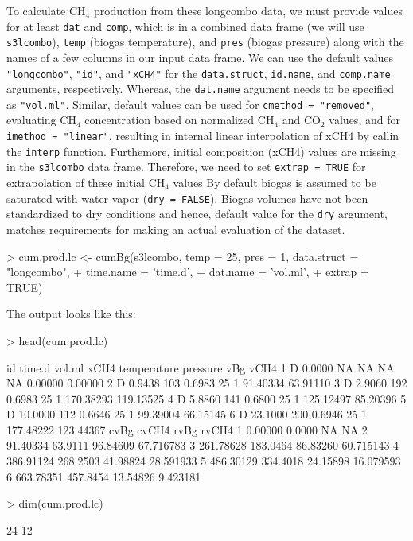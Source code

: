 \documentclass{article}
\begin{document}
To calculate CH$_4$ production from these longcombo data, we must provide values for at least \texttt{dat} and \texttt{comp}, which is in a combined data frame (we will use \texttt{s3lcombo}), \texttt{temp} (biogas temperature), and \texttt{pres} (biogas pressure) along with the names of a few columns in our input data frame.
We can use the default values \texttt{"longcombo"}, \texttt{"id"}, and \texttt{"xCH4"} for the \texttt{data.struct}, \texttt{id.name}, and \texttt{comp.name} arguments, respectively. Whereas, the \texttt{dat.name} argument needs to be specified as \texttt{"vol.ml"}.
Similar, default values can be used for \texttt{cmethod = "removed"}, evaluating CH$_4$ concentration based on normalized CH$_4$ and CO$_2$ values, and for \texttt{imethod = "linear"}, resulting in internal linear interpolation of xCH4 by callin the \texttt{interp} function. 
Furthemore, initial composition (xCH4) values are missing in the \texttt{s3lcombo} data frame. Therefore, we need to set \texttt{extrap = TRUE} for extrapolation of these initial CH$_4$ values
By default biogas is assumed to be saturated with water vapor (\texttt{dry = FALSE}). Biogas volumes have not been standardized to dry conditions and hence, default value for the \texttt{dry} argument, matches requirements for making an actual evaluation of the dataset.
  
\begin{Schunk}
\begin{Sinput}
> cum.prod.lc <- cumBg(s3lcombo, temp = 25, pres = 1, data.struct = "longcombo", 
+                      time.name = 'time.d', 
+                      dat.name = 'vol.ml', 
+                      extrap = TRUE)
\end{Sinput}
\end{Schunk}

The output looks like this:

\begin{Schunk}
\begin{Sinput}
> head(cum.prod.lc)
\end{Sinput}
\begin{Soutput}
  id  time.d vol.ml   xCH4 temperature pressure       vBg      vCH4
1  D  0.0000     NA     NA          NA       NA   0.00000   0.00000
2  D  0.9438    103 0.6983          25        1  91.40334  63.91110
3  D  2.9060    192 0.6983          25        1 170.38293 119.13525
4  D  5.8860    141 0.6800          25        1 125.12497  85.20396
5  D 10.0000    112 0.6646          25        1  99.39004  66.15145
6  D 23.1000    200 0.6946          25        1 177.48222 123.44367
       cvBg    cvCH4     rvBg     rvCH4
1   0.00000   0.0000       NA        NA
2  91.40334  63.9111 96.84609 67.716783
3 261.78628 183.0464 86.83260 60.715143
4 386.91124 268.2503 41.98824 28.591933
5 486.30129 334.4018 24.15898 16.079593
6 663.78351 457.8454 13.54826  9.423181
\end{Soutput}
\begin{Sinput}
> dim(cum.prod.lc)
\end{Sinput}
\begin{Soutput}
[1] 24 12
\end{Soutput}
\end{Schunk}
\end{document}
